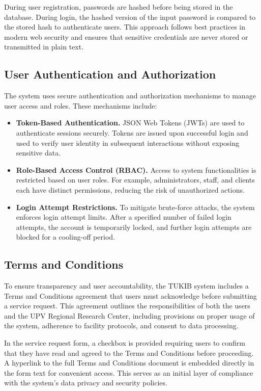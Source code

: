 During user registration, passwords are hashed before being stored in the database. During login, the hashed version of the input password is compared to the stored hash to authenticate users. This approach follows best practices in modern web security and ensures that sensitive credentials are never stored or transmitted in plain text.

\subsection{User Authentication and Authorization}

The system uses secure authentication and authorization mechanisms to manage user access and roles. These mechanisms include:

\begin{itemize}
	\item \textbf{Token-Based Authentication.} JSON Web Tokens (JWTs) are used to authenticate sessions securely. Tokens are issued upon successful login and used to verify user identity in subsequent interactions without exposing sensitive data.
	\item \textbf{Role-Based Access Control (RBAC).} Access to system functionalities is restricted based on user roles. For example, administrators, staff, and clients each have distinct permissions, reducing the risk of unauthorized actions.
	\item \textbf{Login Attempt Restrictions.} To mitigate brute-force attacks, the system enforces login attempt limits. After a specified number of failed login attempts, the account is temporarily locked, and further login attempts are blocked for a cooling-off period.
\end{itemize}

\subsection{Terms and Conditions}

To ensure transparency and user accountability, the TUKIB system includes a Terms and Conditions agreement that users must acknowledge before submitting a service request. This agreement outlines the responsibilities of both the users and the UPV Regional Research Center, including provisions on proper usage of the system, adherence to facility protocols, and consent to data processing.

In the service request form, a checkbox is provided requiring users to confirm that they have read and agreed to the Terms and Conditions before proceeding. A hyperlink to the full Terms and Conditions document is embedded directly in the form text for convenient access. This serves as an initial layer of compliance with the system’s data privacy and security policies.

